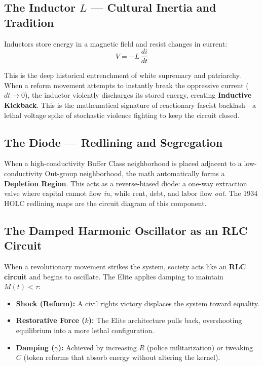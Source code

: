\subsection{The Inductor $L$ --- Cultural Inertia and Tradition}
\label{subsec:inductor}

Inductors store energy in a magnetic field and resist changes in current:
\begin{equation}\label{eq:0.6-inductive-kickback}
V = -L\,\frac{di}{dt}
\end{equation}

This is the deep historical entrenchment of white supremacy and patriarchy.
When a reform movement attempts to instantly break the oppressive current
($dt \to 0$), the inductor violently discharges its stored energy, creating
\textbf{Inductive Kickback}. This is the mathematical signature of reactionary
fascist backlash---a lethal voltage spike of stochastic violence fighting to keep
the circuit closed.

\subsection{The Diode --- Redlining and Segregation}

When a high-conductivity Buffer Class neighborhood is placed adjacent to a
low-conductivity Out-group neighborhood, the math automatically forms a
\textbf{Depletion Region}. This acts as a reverse-biased diode: a one-way
extraction valve where capital cannot flow \emph{in}, while rent, debt, and labor
flow \emph{out}. The 1934 HOLC redlining maps are the circuit diagram of this
component.

\subsection{The Damped Harmonic Oscillator as an RLC Circuit}

When a revolutionary movement strikes the system, society acts like an
\textbf{RLC circuit} and begins to oscillate. The Elite applies damping to
maintain $M(t) < \tau$:
\begin{itemize}
    \item \textbf{Shock (Reform):} A civil rights victory displaces the system
    toward equality.
    \item \textbf{Restorative Force ($k$):} The Elite architecture pulls back,
    overshooting equilibrium into a more lethal configuration.
    \item \textbf{Damping ($\gamma$):} Achieved by increasing $R$ (police
    militarization) or tweaking $C$ (token reforms that absorb energy without
    altering the kernel).
\end{itemize}


